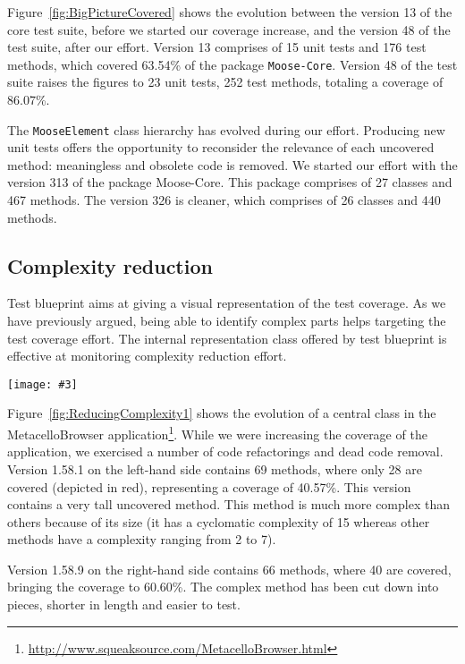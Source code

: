 \documentclass{sig-alternate}
\newcommand{\ct}{\lstinline[backgroundcolor=\color{white},basicstyle=\footnotesize\ttfamily]}
\newcommand{\largefig}[4]{
	\begin{figure*}[#1]
		\centering
		\texttt{[image: \#3]}
		\caption{\label{fig:#3}#4}
	\end{figure*}}
\newcommand{\seclabel}[1]{\label{sec:#1}}
\newcommand{\figref}[1]{Figure~\ref{fig:#1}}
\begin{document}
\figref{BigPictureCovered} shows the evolution between the version 13 of the core test suite, before we started our coverage increase, and the version 48 of the test suite, after our effort. Version 13 comprises of 15 unit tests and 176 test methods, which covered 63.54\% of the package \ct{Moose-Core}.  Version 48 of the test suite raises the figures to 23 unit tests, 252 test methods, totaling a coverage of 86.07\%.

The \ct{MooseElement} class hierarchy has evolved during our effort. Producing new unit tests offers the opportunity to reconsider the relevance of each uncovered method: meaningless and obsolete code is removed. We started our effort with the version 313 of the package Moose-Core. This package comprises of 27 classes and 467 methods. The version 326 is cleaner, which comprises of 26 classes and 440 methods.

\subsection{Complexity reduction}\seclabel{complexityReduction}

Test blueprint aims at giving a visual representation of the test coverage. As we have previously argued, being able to identify complex parts helps targeting the test coverage effort. The internal representation class offered by test blueprint is effective at monitoring complexity reduction effort.

\largefig{}{0.5}{ReducingComplexity1}{Complexity reduction in MetacelloBrowser.}

\figref{ReducingComplexity1} shows the evolution of a central class in the MetacelloBrowser application\footnote{\url{http://www.squeaksource.com/MetacelloBrowser.html}}. While we were increasing the coverage of the application, we exercised a number of code refactorings and dead code removal. Version 1.58.1 on the left-hand side contains 69 methods, where only 28 are covered (depicted in red), representing a coverage of 40.57\%.  This version contains a very tall uncovered method. This method is much more complex than others because of its size (it has a cyclomatic complexity of 15 whereas other methods have a complexity ranging from 2 to 7). 

Version 1.58.9 on the right-hand side contains 66 methods, where 40 are covered, bringing the coverage to 60.60\%. The complex method has been cut down into pieces, shorter in length and easier to test. 
\end{document}
